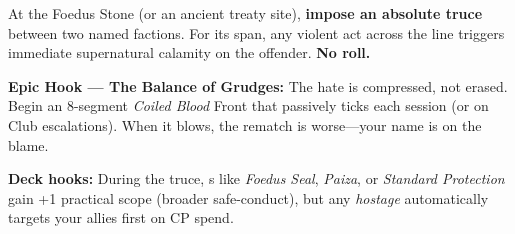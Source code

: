 \begin{tcolorbox}[enhanced,sharp corners,boxrule=.6pt,title={Talent — The Law That Binds Spears (18 XP, 1/campaign)}]
At the Foedus Stone (or an ancient treaty site), \textbf{impose an absolute truce} between two named factions. For its span, any violent act across the line triggers immediate supernatural calamity on the offender. \textbf{No roll.}
\end{tcolorbox}

\textbf{Epic Hook — The Balance of Grudges:} The hate is compressed, not erased. Begin an 8-segment \emph{Coiled Blood} Front that passively ticks each session (or on Club escalations). When it blows, the rematch is worse—your name is on the blame.

\textbf{Deck hooks:} During the truce, \SuitDiamond{}s like \emph{Foedus Seal}, \emph{Paiza}, or \emph{Standard Protection} gain +1 practical scope (broader safe-conduct), but any \emph{hostage} \SuitClub{} automatically targets your allies first on CP spend.
